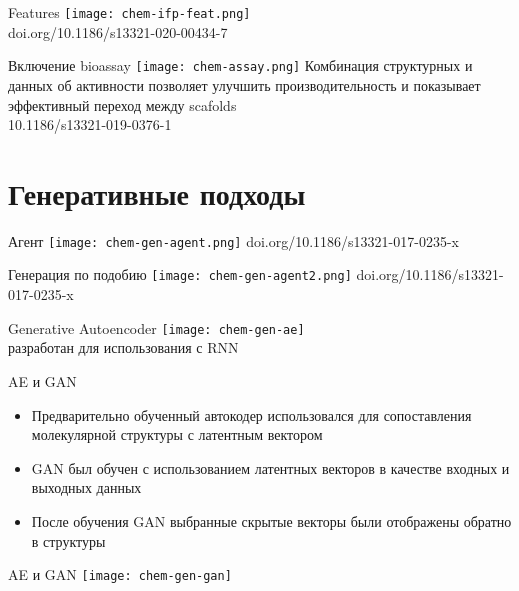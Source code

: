\begin{frame}{Features}
    \centering
    \texttt{[image: chem-ifp-feat.png]}\\
    \footnotesize doi.org/10.1186/s13321-020-00434-7
\end{frame}


\begin{frame}{Включение bioassay}
    \texttt{[image: chem-assay.png]}
    Комбинация структурных и данных об активности позволяет улучшить производительность и показывает эффективный переход между scafolds \\
    \footnotesize 10.1186/s13321-019-0376-1
\end{frame}

\section{Генеративные подходы}


\begin{frame}{Агент}
    \texttt{[image: chem-gen-agent.png]}
    doi.org/10.1186/s13321-017-0235-x
\end{frame}
\begin{frame}{Генерация по подобию}
    \texttt{[image: chem-gen-agent2.png]}
    doi.org/10.1186/s13321-017-0235-x
\end{frame}

\begin{frame}{ Generative Autoencoder}
    \texttt{[image: chem-gen-ae]}\\
    разработан для использования с RNN
\end{frame}

\begin{frame}{AE и GAN}
    \begin{itemize}
        \item Предварительно обученный автокодер использовался для сопоставления молекулярной структуры с латентным вектором
        \item GAN был обучен с использованием латентных векторов в качестве входных и выходных данных 
        \item После обучения GAN выбранные скрытые векторы были отображены обратно в структуры  
    \end{itemize}
\end{frame}
\begin{frame}{AE и GAN}
    \centering
    \texttt{[image: chem-gen-gan]}
\end{frame}

